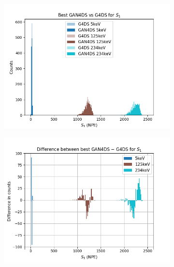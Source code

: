 \documentclass[11pt]{article} %
\begin{document}
\begin{figure}[H]
\centering
\begin{minipage}{\textwidth}
  \begin{subfigure}{.5\textwidth}
      \includegraphics[scale=0.6]{./images/best_s1.png}
  \end{subfigure}
  \begin{subfigure}{.5\textwidth}
      \includegraphics[scale=0.6]{./images/difference_best_s1.png}
  \end{subfigure}
\end{minipage}
\begin{minipage}{\textwidth}
  \begin{subfigure}{.5\textwidth}

\end{subfigure}
\end{minipage}
\end{figure}
\end{document}
